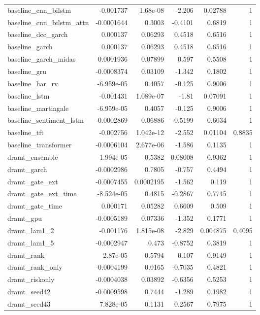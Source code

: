 \begin{table}
\begin{tabular}{lrrrrr}
baseline_cnn_bilstm & -0.001737 & 1.68e-08 & -2.206 & 0.02788 & 1 \\
baseline_cnn_bilstm_attn & -0.0001644 & 0.3003 & -0.4101 & 0.6819 & 1 \\
baseline_dcc_garch & 0.000137 & 0.06293 & 0.4518 & 0.6516 & 1 \\
baseline_garch & 0.000137 & 0.06293 & 0.4518 & 0.6516 & 1 \\
baseline_garch_midas & 0.0001936 & 0.07899 & 0.597 & 0.5508 & 1 \\
baseline_gru & -0.0008374 & 0.03109 & -1.342 & 0.1802 & 1 \\
baseline_har_rv & -6.959e-05 & 0.4057 & -0.125 & 0.9006 & 1 \\
baseline_lstm & -0.001431 & 1.089e-07 & -1.81 & 0.07091 & 1 \\
baseline_martingale & -6.959e-05 & 0.4057 & -0.125 & 0.9006 & 1 \\
baseline_sentiment_lstm & -0.0002869 & 0.06886 & -0.5199 & 0.6034 & 1 \\
baseline_tft & -0.002756 & 1.042e-12 & -2.552 & 0.01104 & 0.8835 \\
baseline_transformer & -0.0006104 & 2.677e-06 & -1.586 & 0.1135 & 1 \\
dramt_ensemble & 1.994e-05 & 0.5382 & 0.08008 & 0.9362 & 1 \\
dramt_garch & -0.0002986 & 0.7805 & -0.757 & 0.4494 & 1 \\
dramt_gate_ext & -0.0007455 & 0.0002195 & -1.562 & 0.119 & 1 \\
dramt_gate_ext_time & -8.524e-05 & 0.4815 & -0.2867 & 0.7745 & 1 \\
dramt_gate_time & 0.000171 & 0.05282 & 0.6609 & 0.509 & 1 \\
dramt_gpu & -0.0005189 & 0.07336 & -1.352 & 0.1771 & 1 \\
dramt_lam1_2 & -0.001176 & 1.815e-08 & -2.829 & 0.004875 & 0.4095 \\
dramt_lam1_5 & -0.0002947 & 0.473 & -0.8752 & 0.3819 & 1 \\
dramt_rank & 2.87e-05 & 0.5794 & 0.107 & 0.9149 & 1 \\
dramt_rank_only & -0.0004199 & 0.0165 & -0.7035 & 0.4821 & 1 \\
dramt_riskonly & -0.0004038 & 0.03892 & -0.6356 & 0.5253 & 1 \\
dramt_seed42 & -0.0009598 & 0.7444 & -1.289 & 0.1982 & 1 \\
dramt_seed43 & 7.828e-05 & 0.1131 & 0.2567 & 0.7975 & 1 \\

\end{tabular}
\end{table}
